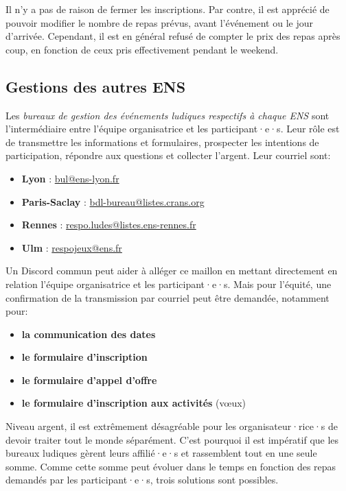 Il n'y a pas de raison de fermer les inscriptions. Par contre, il est apprécié de pouvoir modifier le nombre de repas prévus, avant l'événement ou le jour d'arrivée. Cependant, il est en général refusé de compter le prix des repas après coup, en fonction de ceux pris effectivement pendant le weekend.

\subsection{Gestions des autres ENS}\label{sec:autres-ENS}

Les \emph{bureaux de gestion des événements ludiques respectifs à chaque ENS} sont l'intermédiaire entre l'équipe organisatrice et les participant·e·s. Leur rôle est de transmettre les informations et formulaires, prospecter les intentions de participation, répondre aux questions et collecter l'argent. Leur courriel sont:

\newcommand{\email}[1]{\href{mailto:#1}{#1}}
\begin{itemize}
    \item \textbf{Lyon} : \email{bul@ens-lyon.fr}
    \item \textbf{Paris-Saclay} : \email{bdl-bureau@listes.crans.org}
    \item \textbf{Rennes} : \email{respo.ludes@listes.ens-rennes.fr}
    \item \textbf{Ulm} : \email{respojeux@ens.fr}
\end{itemize}

Un Discord commun peut aider à alléger ce maillon en mettant directement en relation l'équipe organisatrice et les participant·e·s. Mais pour l'équité, une confirmation de la transmission par courriel peut être demandée, notamment pour:

\begin{itemize}
    \item \textbf{la communication des dates}
    \item \textbf{le formulaire d'inscription}
    \item \textbf{le formulaire d'appel d'offre}
    \item \textbf{le formulaire d'inscription aux activités} (vœux)
\end{itemize}

Niveau argent, il est extrêmement désagréable pour les organisateur·rice·s de devoir traiter tout le monde séparément. C'est pourquoi il est impératif que les bureaux ludiques gèrent leurs affilié·e·s et rassemblent tout en une seule somme. Comme cette somme peut évoluer dans le temps en fonction des repas demandés par les participant·e·s, trois solutions sont possibles.


